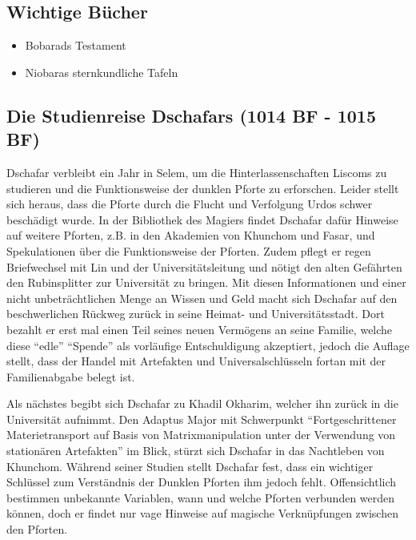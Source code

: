 \hypertarget{wichtige-buxfccher}{%
\subsection{Wichtige Bücher}\label{wichtige-buxfccher}}

\begin{itemize}
\tightlist
\item
  Bobarads Testament
\item
  Niobaras sternkundliche Tafeln
\end{itemize}

\hypertarget{die-studienreise-dschafars-1014-bf---1015-bf}{%
\subsection{Die Studienreise Dschafars (1014 BF - 1015
BF)}\label{die-studienreise-dschafars-1014-bf---1015-bf}}

Dschafar verbleibt ein Jahr in Selem, um die Hinterlassenschaften
Liscoms zu studieren und die Funktionsweise der dunklen Pforte zu
erforschen. Leider stellt sich heraus, dass die Pforte durch die Flucht
und Verfolgung Urdos schwer beschädigt wurde. In der Bibliothek des
Magiers findet Dschafar dafür Hinweise auf weitere Pforten, z.B. in den
Akademien von Khunchom und Fasar, und Spekulationen über die
Funktionsweise der Pforten. Zudem pflegt er regen Briefwechsel mit Lin
und der Universitätsleitung und nötigt den alten Gefährten den
Rubinsplitter zur Universität zu bringen. Mit diesen Informationen und
einer nicht unbeträchtlichen Menge an Wissen und Geld macht sich
Dschafar auf den beschwerlichen Rückweg zurück in seine Heimat- und
Universitätsstadt. Dort bezahlt er erst mal einen Teil seines neuen
Vermögens an seine Familie, welche diese ``edle'' ``Spende'' als
vorläufige Entschuldigung akzeptiert, jedoch die Auflage stellt, dass
der Handel mit Artefakten und Universalschlüsseln fortan mit der
Familienabgabe belegt ist.

Als nächstes begibt sich Dschafar zu Khadil Okharim, welcher ihn zurück
in die Universität aufnimmt. Den Adaptus Major mit Schwerpunkt
``Fortgeschrittener Materietransport auf Basis von Matrixmanipulation
unter der Verwendung von stationären Artefakten'' im Blick, stürzt sich
Dschafar in das Nachtleben von Khunchom. Während seiner Studien stellt
Dschafar fest, dass ein wichtiger Schlüssel zum Verständnis der Dunklen
Pforten ihm jedoch fehlt. Offensichtlich bestimmen unbekannte Variablen,
wann und welche Pforten verbunden werden können, doch er findet nur vage
Hinweise auf magische Verknüpfungen zwischen den Pforten.

